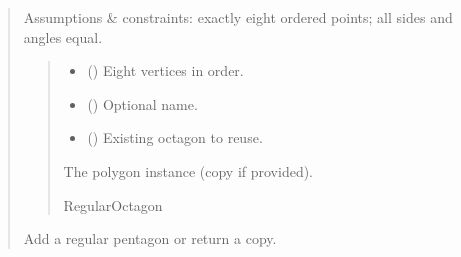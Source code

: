 \documentclass[letterpaper,10pt,english]{sphinxmanual}
\begin{document}
\begin{quote}
\begin{fulllineitems}
\begin{fulllineitems}
\sphinxAtStartPar
Assumptions \& constraints: exactly eight ordered points; all sides and
angles equal.
\begin{quote}\begin{description}
\begin{itemize}
\item {} 
\sphinxAtStartPar
{} () \textendash{} Eight vertices in order.

\item {} 
\sphinxAtStartPar
{} (\sphinxstyleliteralemphasis{\sphinxupquote{ | }}) \textendash{} Optional name.

\item {} 
\sphinxAtStartPar
{} (\sphinxstyleliteralemphasis{\sphinxupquote{ | }}) \textendash{} Existing octagon to reuse.

\end{itemize}

\sphinxAtStartPar
The polygon instance (copy if provided).

\sphinxAtStartPar
RegularOctagon

\end{description}\end{quote}

\end{fulllineitems}


\begin{fulllineitems}
\label{\detokenize{pygeox:pygeox.add_objects.AddNamespace.regular_pentagon}}
\pysigstartsignatures
\pysiglinewithargsret
{}
{\sphinxparamcomma {}\sphinxparamcomma {}}
{}
\pysigstopsignatures
\sphinxAtStartPar
Add a regular pentagon or return a copy.


\end{fulllineitems}
\end{fulllineitems}
\end{quote}
\end{document}
